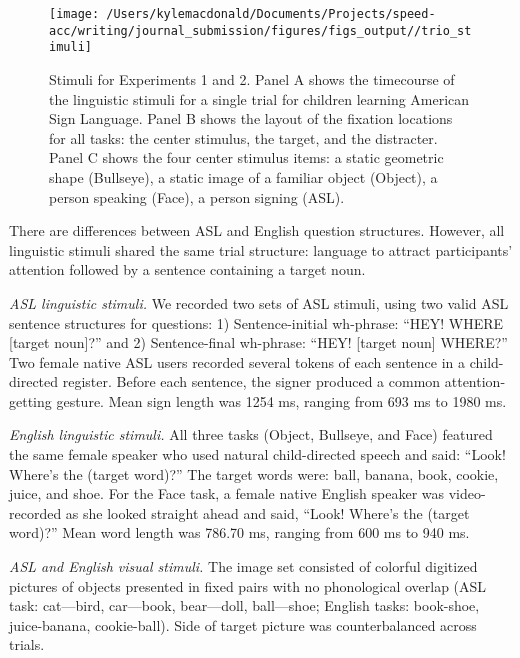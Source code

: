 \documentclass[,man,floatsintext]{apa6}
\begin{document}
\begin{figure}[!t]

{\centering \texttt{[image: /Users/kylemacdonald/Documents/Projects/speed-acc/writing/journal\_submission/figures/figs\_output//trio\_stimuli]} 

}

\caption{Stimuli for Experiments 1 and 2. Panel A shows the timecourse of the linguistic stimuli for a single trial for children learning American Sign Language. Panel B shows the layout of the fixation locations for all tasks: the center stimulus, the target, and the distracter. Panel C shows the four center stimulus items: a static geometric shape (Bullseye), a static image of a familiar object (Object), a person speaking (Face), a person signing (ASL).}\label{fig:trio-stim}
\end{figure}

There are differences between ASL and English question structures.
However, all linguistic stimuli shared the same trial structure:
language to attract participants' attention followed by a sentence
containing a target noun.

\emph{ASL linguistic stimuli.} We recorded two sets of ASL stimuli,
using two valid ASL sentence structures for questions: 1)
Sentence-initial wh-phrase: \enquote{HEY! WHERE {[}target noun{]}?} and
2) Sentence-final wh-phrase: \enquote{HEY! {[}target noun{]} WHERE?} Two
female native ASL users recorded several tokens of each sentence in a
child-directed register. Before each sentence, the signer produced a
common attention-getting gesture. Mean sign length was 1254 ms, ranging
from 693 ms to 1980 ms.

\emph{English linguistic stimuli.} All three tasks (Object, Bullseye,
and Face) featured the same female speaker who used natural
child-directed speech and said: \enquote{Look! Where's the (target
word)?} The target words were: ball, banana, book, cookie, juice, and
shoe. For the Face task, a female native English speaker was
video-recorded as she looked straight ahead and said, \enquote{Look!
Where's the (target word)?} Mean word length was 786.70 ms, ranging from
600 ms to 940 ms.

\emph{ASL and English visual stimuli.} The image set consisted of
colorful digitized pictures of objects presented in fixed pairs with no
phonological overlap (ASL task: cat---bird, car---book, bear---doll,
ball---shoe; English tasks: book-shoe, juice-banana, cookie-ball). Side
of target picture was counterbalanced across trials.
\end{document}

